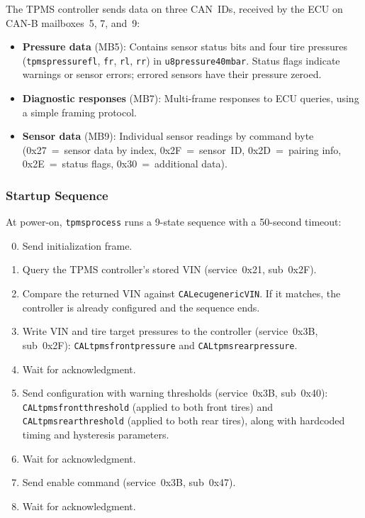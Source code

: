 \documentclass[a4paper,11pt]{article}
\renewcommand{\_}{\oldunderscore\allowbreak}
\begin{document}
The TPMS controller sends data on three CAN~IDs, received by the ECU on
CAN-B mailboxes~5, 7, and~9:

\begin{itemize}
\item \textbf{Pressure data} (MB5): Contains sensor status bits and four tire
      pressures (\texttt{tpms\_pressure\_fl}, \texttt{\_fr}, \texttt{\_rl},
      \texttt{\_rr}) in \texttt{u8\_pressure\_40mbar}. Status flags indicate
      warnings or sensor errors; errored sensors have their pressure zeroed.
\item \textbf{Diagnostic responses} (MB7): Multi-frame responses to ECU
      queries, using a simple framing protocol.
\item \textbf{Sensor data} (MB9): Individual sensor readings by command byte
      (0x27~=~sensor data by index, 0x2F~=~sensor~ID, 0x2D~=~pairing info,
      0x2E~=~status flags, 0x30~=~additional data).
\end{itemize}

\subsubsection*{Startup Sequence}

At power-on, \texttt{tpms\_process} runs a 9-state sequence with a 50-second
timeout:

\begin{enumerate}
\setcounter{enumi}{-1}
\item Send initialization frame.
\item Query the TPMS controller's stored VIN (service~0x21, sub~0x2F).
\item Compare the returned VIN against \texttt{CAL\_ecu\_generic\_VIN}. If it
      matches, the controller is already configured and the sequence ends.
\item Write VIN and tire target pressures to the controller (service~0x3B,
      sub~0x2F): \texttt{CAL\_tpms\_front\_pressure} and
      \texttt{CAL\_tpms\_rear\_pressure}.
\item Wait for acknowledgment.
\item Send configuration with warning thresholds (service~0x3B, sub~0x40):
      \texttt{CAL\_tpms\_front\_threshold} (applied to both front tires) and
      \texttt{CAL\_tpms\_rear\_threshold} (applied to both rear tires), along
      with hardcoded timing and hysteresis parameters.
\item Wait for acknowledgment.
\item Send enable command (service~0x3B, sub~0x47).
\item Wait for acknowledgment.
\end{enumerate}
\end{document}
